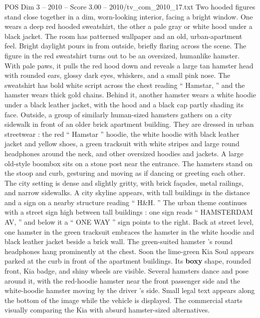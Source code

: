 \begin{textsample}{POS Dim 3 – 2010 – Score 3.00 – 2010/tv\_com\_2010\_17.txt}  \label{ex:f3_pos_084}
Two hooded figures stand close together in a dim, worn-looking interior, facing a bright window.
One wears a deep red hooded sweatshirt, the other a pale gray or white hood under a black jacket.
The room has patterned wallpaper and an old, urban-apartment feel.
Bright daylight pours in from outside, briefly flaring across the scene.
The figure in the red sweatshirt turns out to be an oversized, humanlike hamster.
With pale paws, it pulls the red hood down and reveals a large tan hamster head with rounded ears, glossy dark eyes, whiskers, and a small pink nose.
The sweatshirt has bold white script across the chest reading “ Hamstar, ” and the hamster wears thick gold chains.
Behind it, another hamster wears a white hoodie under a black leather jacket, with the hood and a black cap partly shading its face.
Outside, a group of similarly human-sized hamsters gathers on a city sidewalk in front of an older brick apartment building.
They are dressed in urban streetwear : the red “ Hamstar ” hoodie, the white hoodie with black leather jacket and yellow shoes, a green tracksuit with white stripes and large round headphones around the neck, and other oversized hoodies and jackets.
A large old-style boombox sits on a stone post near the entrance.
The hamsters stand on the stoop and curb, gesturing and moving as if dancing or greeting each other.
The city setting is dense and slightly gritty, with brick façades, metal railings, and narrow sidewalks.
A city skyline appears, with tall buildings in the distance and a sign on a nearby structure reading “ H\&H. ” The urban theme continues with a street sign high between tall buildings : one sign reads “ HAMSTERDAM AV, ” and below it a “ ONE WAY ” sign points to the right.
Back at street level, one hamster in the green tracksuit embraces the hamster in the white hoodie and black leather jacket beside a brick wall.
The green-suited hamster ’s round headphones hang prominently at the chest.
Soon the lime-green Kia Soul appears parked at the curb in front of the apartment buildings.
Its \textbf{boxy} shape, rounded front, Kia badge, and shiny wheels are visible.
Several hamsters dance and pose around it, with the red-hoodie hamster near the front passenger side and the white-hoodie hamster moving by the driver ’s side.
Small legal text appears along the bottom of the image while the vehicle is displayed.
The commercial starts visually comparing the Kia with absurd hamster-sized alternatives.

\end{textsample}
